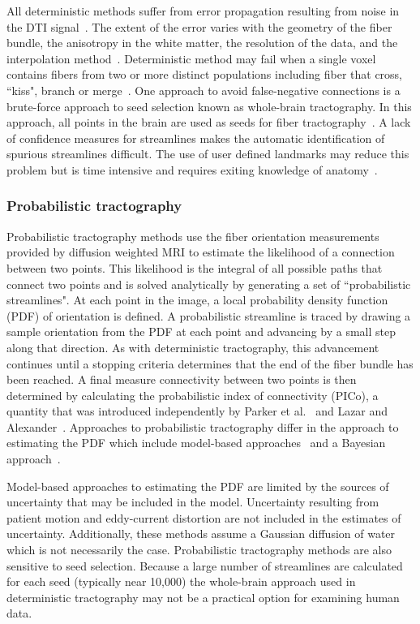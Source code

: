 All deterministic methods suffer from error propagation resulting from noise in the DTI signal~\cite{Basser2000}. The extent of the error varies with the geometry of the fiber bundle, the anisotropy in the white matter, the resolution of the data, and the interpolation method~\cite{Lori1999}. Deterministic method may fail when a single voxel contains fibers from two or more distinct populations including fiber that cross, ``kiss", branch or merge~\cite{Basser2000}. One approach to avoid false-negative connections is a brute-force approach to seed selection known as whole-brain tractography. In this approach, all points in the brain are used as seeds for fiber tractography~\cite{Conturo1999}.
A lack of confidence measures for streamlines makes the automatic identification of spurious streamlines difficult. The use of user defined landmarks may reduce this problem but is time intensive and requires exiting knowledge of anatomy~\cite{Mori2002a,Wakana2004,Wakana2007}.

\subsubsection{Probabilistic tractography}
Probabilistic tractography methods use the fiber orientation measurements provided by diffusion weighted MRI to estimate the likelihood of a connection between two points. This likelihood is the integral of all possible paths that connect two points and is solved analytically by generating a set of ``probabilistic streamlines". At each point in the image, a local probability density function (PDF) of orientation is defined. A probabilistic streamline is traced by drawing a sample orientation from the PDF at each point and advancing by a small step along that direction. As with deterministic tractography, this advancement continues until a stopping criteria determines that the end of the fiber bundle has been reached. A final measure connectivity between two points is then determined by calculating the probabilistic index of connectivity (PICo), a quantity that was introduced independently by Parker et al.\ \cite{Parker2002} and Lazar and Alexander~\cite{Lazar2003}. Approaches to probabilistic tractography differ in the approach to estimating the PDF which include model-based approaches~\cite{Parker2002,Lazar2003} and a Bayesian approach~\cite{Behrens2004}. 

Model-based approaches to estimating the PDF are limited by the sources of uncertainty that may be included in the model. Uncertainty resulting from patient motion and eddy-current distortion are not included in the estimates of uncertainty. Additionally, these methods assume a Gaussian diffusion of water which is not necessarily the case. Probabilistic tractography methods are also sensitive to seed selection. Because a large number of streamlines are calculated for each seed (typically near 10,000) the whole-brain approach used in deterministic tractography may not be a practical option for examining human data. 

